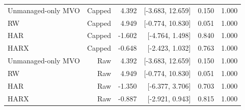 \begin{table}[p]
\begin{tabular}{lrrrrr}
\hline
Unmanaged-only MVO & Capped & 4.392 & [-3.683, 12.659] & 0.150 & 1.000 \\
RW & Capped & 4.949 & [-0.774, 10.830] & 0.051 & 1.000 \\
HAR & Capped & -1.602 & [-4.764, 1.498] & 0.840 & 1.000 \\
HARX & Capped & -0.648 & [-2.423, 1.032] & 0.763 & 1.000 \\
Unmanaged-only MVO & Raw & 4.392 & [-3.683, 12.659] & 0.150 & 1.000 \\
RW & Raw & 4.949 & [-0.774, 10.830] & 0.051 & 1.000 \\
HAR & Raw & -1.350 & [-6.377, 3.706] & 0.703 & 1.000 \\
HARX & Raw & -0.887 & [-2.921, 0.943] & 0.815 & 1.000 \\
\hline
\end{tabular}
\end{table}
